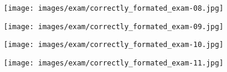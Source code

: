 \begin{figure}[!ht]
    \begin{center}
    \advance\leftskip-3cm
    \advance\rightskip-3cm
    \texttt{[image: images/exam/correctly\_formated\_exam-08.jpg]}
    \label{fig:correctly_formated_exam-08}
\end{center}
\end{figure}

\begin{figure}[!ht]
    \begin{center}
    \advance\leftskip-3cm
    \advance\rightskip-3cm
    \texttt{[image: images/exam/correctly\_formated\_exam-09.jpg]}
    \label{fig:correctly_formated_exam-09}
\end{center}
\end{figure}

\begin{figure}[!ht]
    \begin{center}
    \advance\leftskip-3cm
    \advance\rightskip-3cm
    \texttt{[image: images/exam/correctly\_formated\_exam-10.jpg]}
    \label{fig:correctly_formated_exam-10}
\end{center}
\end{figure}

\begin{figure}[!ht]
    \begin{center}
    \advance\leftskip-3cm
    \advance\rightskip-3cm
    \texttt{[image: images/exam/correctly\_formated\_exam-11.jpg]}
    \label{fig:correctly_formated_exam-11}
\end{center}
\end{figure}
